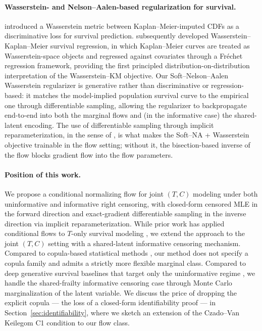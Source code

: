\paragraph{Wasserstein- and Nelson--Aalen-based regularization for survival.}
\citet{sylvain2021wasserstein} introduced a Wasserstein metric between
Kaplan--Meier-imputed CDFs as a discriminative loss for survival prediction.
\citet{zhou2024wkm} subsequently developed Wasserstein--Kaplan--Meier
survival regression, in which Kaplan--Meier curves are treated as
Wasserstein-space objects and regressed against covariates through a
Fr\'echet regression framework, providing the first principled
distribution-on-distribution interpretation of the Wasserstein--KM objective.
Our Soft--Nelson--Aalen Wasserstein regularizer is generative rather than
discriminative or regression-based: it matches the model-implied population
survival curve to the empirical one through differentiable sampling, allowing
the regularizer to backpropagate end-to-end into both the marginal flows and
(in the informative case) the shared-latent encoding. The use of differentiable sampling through
implicit reparameterization, in the sense of \citet{figurnov2018implicit},
is what makes the Soft--NA + Wasserstein objective trainable in the flow
setting; without it, the bisection-based inverse of the flow blocks gradient
flow into the flow parameters.

\paragraph{Position of this work.}
We propose a conditional normalizing flow for joint $(T, C)$ modeling
under both uninformative and informative right censoring, with closed-form
censored MLE in the forward direction and exact-gradient differentiable
sampling in the inverse direction via implicit reparameterization.
While prior work has applied conditional flows to
$T$-only survival modeling \citep{ausset2021conditional}, we extend
the approach to the joint $(T, C)$ setting with a shared-latent
informative censoring mechanism. Compared to copula-based statistical methods
\citep{czado2023dependent,deresa2021semiparametric,zhang2024deepcopula}, our
method does not specify a copula family and admits a strictly more flexible
marginal class. Compared to deep generative survival baselines that target
only the uninformative regime \citep{nagpal2021dsm,ausset2021conditional,
norcliffe2023survivalgan}, we handle the shared-frailty informative censoring
case through Monte Carlo marginalization of the latent variable. We discuss
the price of dropping the explicit copula --- the loss of a closed-form
identifiability proof --- in Section~\ref{sec:identifiability}, where we
sketch an extension of the Czado--Van Keilegom C1 condition to our flow class.
